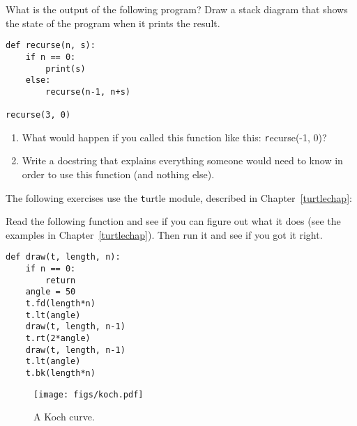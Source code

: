 \documentclass[
DIV=11,
fontsize=12,
twoside,
headinclude=false,
titlepage=firstiscover,
abstract=true,
headsepline=true,
footsepline=true,
chapterprefix=true, %
headings=big,
bibliography=totoc,%
captions=tableheading
]{scrbook}
\theoremstyle{definition}
\begin{document}
\begin{exercise}
\normalfont
What is the output of the following program?
Draw a stack diagram that shows the state of the program
when it prints the result.

\begin{lstlisting}
def recurse(n, s):
    if n == 0:
        print(s)
    else:
        recurse(n-1, n+s)

recurse(3, 0)
\end{lstlisting}

\begin{enumerate}

\item What would happen if you called this function like this: {\texttt
  recurse(-1, 0)}?

\item Write a docstring that explains everything someone would need to
  know in order to use this function (and nothing else).

\end{enumerate}

\end{exercise}


The following exercises use the {\texttt turtle} module, described in
Chapter~\ref{turtlechap}:

\begin{exercise}
\normalfont

Read the following function and see if you can figure out
what it does (see the examples in Chapter~\ref{turtlechap}).  Then run it 
and see if you got it right.

\begin{lstlisting}
def draw(t, length, n):
    if n == 0:
        return
    angle = 50
    t.fd(length*n)
    t.lt(angle)
    draw(t, length, n-1)
    t.rt(2*angle)
    draw(t, length, n-1)
    t.lt(angle)
    t.bk(length*n)
\end{lstlisting}

\end{exercise}


\begin{figure}
\centerline
{\texttt{[image: figs/koch.pdf]}}
\caption{A Koch curve.}
\label{fig.koch}
\end{figure}
\end{document}
